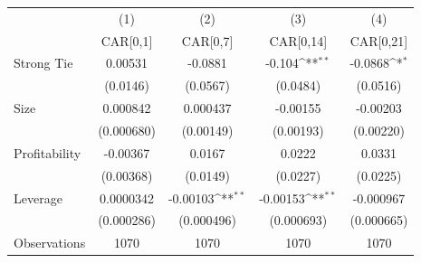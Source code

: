 {
\def\sym#1{\ifmmode^{#1}\else\(^{#1}\)\fi}
\begin{tabular}{l*{4}{c}}
\hline\hline
                    &\multicolumn{1}{c}{(1)}&\multicolumn{1}{c}{(2)}&\multicolumn{1}{c}{(3)}&\multicolumn{1}{c}{(4)}\\
                    &\multicolumn{1}{c}{CAR[0,1]}&\multicolumn{1}{c}{CAR[0,7]}&\multicolumn{1}{c}{CAR[0,14]}&\multicolumn{1}{c}{CAR[0,21]}\\
\hline
Strong Tie          &     0.00531         &     -0.0881         &      -0.104\sym{**} &     -0.0868\sym{*}  \\
                    &    (0.0146)         &    (0.0567)         &    (0.0484)         &    (0.0516)         \\
[1em]
Size                &    0.000842         &    0.000437         &    -0.00155         &    -0.00203         \\
                    &  (0.000680)         &   (0.00149)         &   (0.00193)         &   (0.00220)         \\
[1em]
Profitability       &    -0.00367         &      0.0167         &      0.0222         &      0.0331         \\
                    &   (0.00368)         &    (0.0149)         &    (0.0227)         &    (0.0225)         \\
[1em]
Leverage            &   0.0000342         &    -0.00103\sym{**} &    -0.00153\sym{**} &   -0.000967         \\
                    &  (0.000286)         &  (0.000496)         &  (0.000693)         &  (0.000665)         \\
\hline
Observations        &        1070         &        1070         &        1070         &        1070         \\
\hline\hline
\end{tabular}
}
